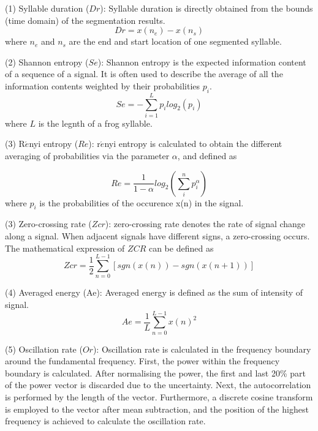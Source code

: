 \vspace{3mm}

\noindent(1) Syllable duration ($Dr$): Syllable duration \citep{Xie1504:Acoustic} is directly obtained from the bounds (time domain) of the segmentation results.
\begin{equation}
Dr = x(n_{e}) - x(n_{s})
\end{equation}
where $n_{e}$ and $n_{s}$ are the end and start location of one segmented syllable.

\vspace{3mm}

\noindent(2) Shannon entropy ($Se$): Shannon entropy is the expected information content of a sequence of a signal. It is often used to describe the average of all the information contents weighted by their probabilities $p_{i}$.
\begin{equation}
Se=-\sum_{i=1}^{L}p_{i}log_{2}(p_{i})
\end{equation}
where $L$ is the legnth of a frog syllable.

\vspace{3mm}

\noindent(3) R$\acute{e}$nyi entropy ($Re$): r$\acute{e}$nyi entropy is calculated to obtain the different averaging of probabilities via the parameter $\alpha$, and defined as

\begin{equation}
Re=\frac{1}{1-\alpha}log_{2}(\sum_{i}^{n}p_{i}^{\alpha})
\end{equation}
where $p_{i}$ is the probabilities of the occurence x(n) in the signal.

\vspace{3mm}

\noindent(3) Zero-crossing rate ($Zcr$): zero-crossing rate denotes the rate of signal change along a signal. When adjacent signals have different signs, a zero-crossing occurs. The mathematical expression of $ZCR$ can be defined as
\begin{equation}
Zcr=\frac{1}{2}\sum_{n=0}^{L-1}[sgn(x(n))-sgn(x(n+1))]
\end{equation}

\vspace{3mm}

\noindent(4) Averaged energy (Ae): Averaged energy is defined as the sum of intensity of signal.
\begin{equation}
Ae = \frac{1}{L}\sum_{n=0}^{L-1}x(n)^{2}
\end{equation}


\vspace{3mm}
\noindent(5) Oscillation rate ($Or$): Oscillation rate is calculated in the frequency boundary around the fundamental frequency. First, the power within the frequency boundary is calculated. After normalising the power, the first and last 20\% part of the power vector is discarded due to the uncertainty. Next, the autocorrelation is performed by the length of the vector. Furthermore, a discrete cosine transform is employed to the vector after mean subtraction, and the position of the highest frequency is achieved to calculate the oscillation rate. 


